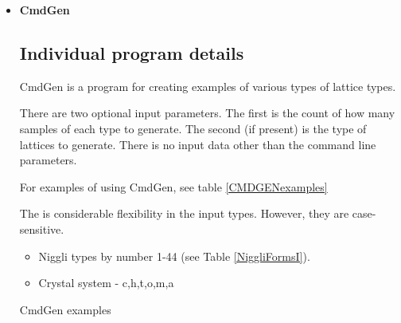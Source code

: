 \documentclass[preprint]{iucr}              %
\numberwithin{equation}{section}
\begin{document}
	\begin{itemize}
		  \setlength\itemsep{3em}
	\item{\textbf{CmdGen}}
	
	\subsection{Individual program details}

CmdGen is a program for creating examples of various types of lattice types.
		
There are two optional input parameters. The first is the count
of how many samples of each type to generate. The second (if present) is
the type of lattices to generate.  There is no input data
other than the command line parameters.

For examples of using CmdGen, see table \ref{CMDGENexamples}


The is considerable flexibility in the input types. However, they
are case-sensitive.


\begin{itemize}
	\item Niggli types by number 1-44 (see Table \ref{NiggliFormsI}).
	\item Crystal system - c,h,t,o,m,a
\end{itemize}


\vspace{2pt}

\begin{table}
		
		\label{CMDGENexamples}
		\caption{CmdGen examples}


\end{table}
\end{itemize}
\end{document}

